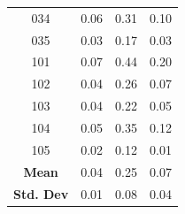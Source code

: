 \documentclass[12pt]{article}
\begin{document}
\begin{table}[!h]
\begin{tabular}{c | c c c}
	034 &   0.06 &     0.31 &       0.10 \\
	035 &   0.03 &     0.17 &       0.03 \\
	101 &   0.07 &     0.44 &       0.20 \\
	102 &   0.04 &     0.26 &       0.07 \\
	103 &   0.04 &     0.22 &       0.05 \\
	104 &   0.05 &     0.35 &       0.12 \\
	105 &   0.02 &     0.12 &       0.01 \\
	\bottomrule
	\textbf{Mean} & 0.04 & 0.25 & 0.07 \\
	\textbf{Std. Dev} & 0.01 & 0.08 & 0.04 \\
\end{tabular}
\label{tab:1}
\end{table}
\newpage
\end{document}
